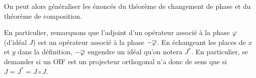 On peut alors généraliser les énoncés du théorème de changement de phase et du théorème de composition.

En particulier, remarquons que l'adjoint d'un opérateur associé à la
phase $\varphi$ (d'idéal $J$) est un opérateur associé à la phase
$-\overline{\varphi}$. En échangeant les places de $x$ et $y$ dans la
définition, $-\overline{\varphi}$ engendre un idéal qu'on notera
$J^*$. En particulier, se demander si un OIF est un projecteur orthogonal n'a donc de sens que si $J=J^*=J\circ J$.